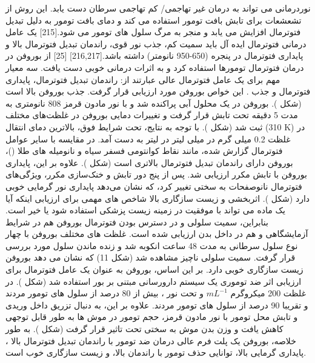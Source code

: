 نوردرمانی می تواند به درمان غیر تهاجمی/ کم تهاجمی سرطان دست یابد. این روش از تشعشعات  برای تابش بافت تومور استفاده می کند و دمای بافت تومور به دلیل تبدیل فتوترمال افزایش می یابد و منجر به مرگ سلول های تومور می شود.[215] یک عامل درمانی فتوترمال ایده آل باید سمیت کم، جذب نور قوی، راندمان تبدیل فتوترمال بالا و پایداری فتوترمال در پنجره  (650-950 نانومتر) داشته باشد.[216,217] [25] از بوروفن در درمان فتوترمال تومورها استفاده کرد و به اثرات درمانی خوبی دست یافت. سه معیار مهم برای یک عامل فتوترمال عالی عبارتند از: راندمان تبدیل فتوترمال، پایداری فتوترمال و جذب . این خواص بوروفن مورد ارزیابی قرار گرفت. جذب  بوروفن بالا است (شکل ). بوروفن در یک محلول آبی پراکنده شد و با نور مادون قرمز 808 نانومتری  به مدت 5 دقیقه تحت تابش قرار گرفت و تغییرات دمایی بوروفن در غلظت‌های مختلف ثبت شد (شکل ). با توجه به نتایج، تحت شرایط فوق، بالاترین دمای انتقال (310 K) در غلظت 0.2 میلی گرم در میلی لیتر در لیتر به دست آمد. در مقایسه با سایر عوامل فتوترمال گزارش شده، مانند نقاط کوانتومی فسفر سیاه  و نانومیله های طلا ()، بوروفن دارای راندمان تبدیل فتوترمال بالاتری  است (شکل ). علاوه بر این، پایداری بوروفن با تابش مکرر  ارزیابی شد. پس از پنج دور تابش و خنک‌سازی مکرر، ویژگی‌های فتوترمال نانوصفحات به سختی تغییر کرد، که نشان می‌دهد پایداری نور گرمایی خوبی دارد (شکل ). اثربخشی و زیست سازگاری بالا شاخص های مهمی برای ارزیابی اینکه آیا یک ماده می تواند با موفقیت در زمینه زیست پزشکی استفاده شود یا خیر است. بنابراین، سمیت سلولی و در دسترس بودن فتوترمال بوروفن هم در شرایط آزمایشگاهی و هم در داخل بدن ارزیابی شده است. غلظت های مختلف بوروفن با چهار نوع سلول سرطانی به مدت 48 ساعت انکوبه شد و زنده ماندن سلول مورد بررسی قرار گرفت. سمیت سلولی ناچیز مشاهده شد (شکل 11) که نشان می دهد بوروفن زیست سازگاری خوبی دارد. بر این اساس، بوروفن به عنوان یک عامل فتوترمال برای ارزیابی اثر ضد توموری یک سیستم دارورسانی مبتنی بر بور استفاده شد (شکل ). در غلظت  200 میکروگرم $mL^{-1}$ و تحت نور ، بیش از 80 درصد از سلول های تومور  مردند و تقریبا 90 درصد از سلول های تومور  مردند. علاوه بر این، به دنبال تزریق داخل وریدی  و تابش محل تومور با نور مادون قرمز، حجم تومور در موش ها به طور قابل توجهی کاهش یافت و وزن بدن موش به سختی تحت تاثیر قرار گرفت (شکل ). به طور خلاصه، بوروفن یک پلت فرم عالی درمان ضد تومور با راندمان تبدیل فتوترمال بالا ، پایداری گرمایی بالا، توانایی حذف تومور با راندمان بالا، و زیست سازگاری خوب است.
